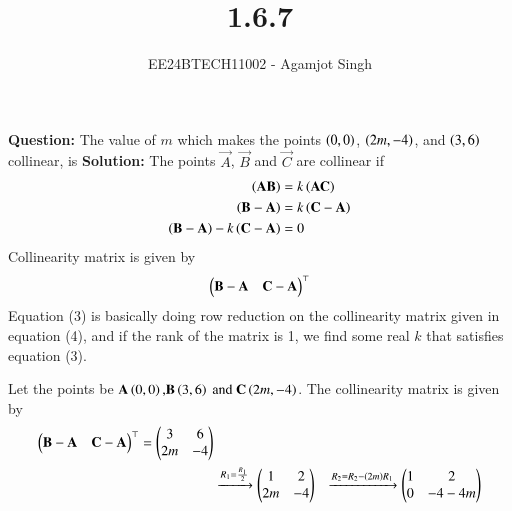 \documentclass[journal]{IEEEtran}
\begin{document}

\vspace{3cm}

\title{1.6.7}
\author{EE24BTECH11002 - Agamjot Singh
}
{\let\newpage\relax\maketitle}

\renewcommand{\thefigure}{\theenumi}
\renewcommand{\thetable}{\theenumi}
\setlength{\intextsep}{10pt} %

\textbf{Question:}
\newline
The value of $m$ which makes the points $\left(0, 0\right)$, $\left(2m, -4\right)$, and $\left(3,6\right)$ collinear, is
\newline
\textbf{Solution:}
\newline
The points $\vec{A}$, $\vec{B}$ and $\vec{C}$ are collinear if
\begin{align}
	\left(\mathbf{AB}\right) &= k\left(\mathbf{AC}\right)\\
	\left(\mathbf{B} - \mathbf{A}\right) &= k\left(\mathbf{C} - \mathbf{A}\right)\\
	\left(\mathbf{B} - \mathbf{A}\right) - k\left(\mathbf{C} - \mathbf{A}\right) &= 0
\end{align}
Collinearity matrix is given by
\begin{align}
	\begin{pmatrix}\mathbf{B} - \mathbf{A} & \mathbf{C} - \mathbf{A}\end{pmatrix}^\top 
\end{align}
Equation (3) is basically doing row reduction on the collinearity matrix given in equation (4), and if the rank of the matrix is 1, we find some real $k$ that satisfies equation (3).
\newline

Let the points be $\mathbf{A}\left(0, 0\right) \text{,} \mathbf{B}\left(3, 6\right) \text{ and } \mathbf{C}\left(2m, -4\right)$.
The collinearity matrix is given by
\begin{align}
	\begin{pmatrix}\mathbf{B} - \mathbf{A} & \mathbf{C} - \mathbf{A}\end{pmatrix}^\top = \begin{pmatrix}3 & 6 \\ 2m & -4\end{pmatrix}\\ 
													   &\xrightarrow{R_1 = \frac{R_1}{2}} \begin{pmatrix}1 & 2\\2m & -4\end{pmatrix}
													   &\xrightarrow{R_2 = R_2 - \left(2m\right)R_1} \begin{pmatrix}1 & 2\\0 & -4-4m\end{pmatrix}
\end{align}
\end{document}

